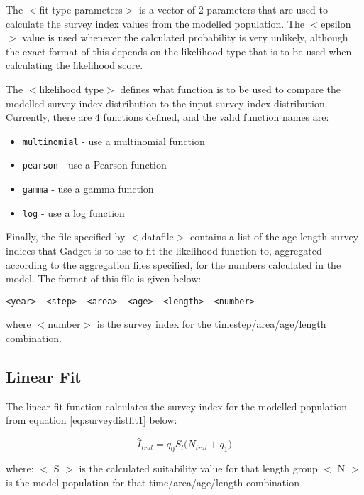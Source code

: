 \documentclass[]{book}
\providecommand{\tightlist}{%
  \setlength{\itemsep}{0pt}\setlength{\parskip}{0pt}}
\begin{document}
The \(<\)fit type parameters\(>\) is a vector of 2 parameters that are used
to calculate the survey index values from the modelled population. The
\(<\)epsilon\(>\) value is used whenever the calculated probability is very
unlikely, although the exact format of this depends on the likelihood
type that is to be used when calculating the likelihood score.

The \(<\)likelihood type\(>\) defines what function is to be used to compare
the modelled survey index distribution to the input survey index
distribution. Currently, there are 4 functions defined, and the valid
function names are:

\begin{itemize}
\tightlist
\item
  \texttt{multinomial} - use a multinomial function
\item
  \texttt{pearson} - use a Pearson function
\item
  \texttt{gamma} - use a gamma function
\item
  \texttt{log} - use a log function
\end{itemize}

Finally, the file specified by \(<\)datafile\(>\) contains a list of the
age-length survey indices that Gadget is to use to fit the likelihood
function to, aggregated according to the aggregation files specified,
for the numbers calculated in the model. The format of this file is
given below:

\begin{verbatim}
<year>  <step>  <area>  <age>  <length>  <number>
\end{verbatim}

where \(<\)number\(>\) is the survey index for the timestep/area/age/length
combination.

\hypertarget{linear-fit}{%
\subsection{Linear Fit}\label{linear-fit}}

The linear fit function calculates the survey index for the modelled
population from
equation \eqref{eq:surveydistfit1} below:

\begin{equation}
\label{eq:surveydistfit1}
\widehat{I}_{tral} = q_{0} S_{l} \big( N_{tral} + q_{1} \big)\end{equation}

where: \(<\) S \(>\) is the calculated suitability value for that length
group \(<\) N \(>\) is the model population for that time/area/age/length
combination
\end{document}
